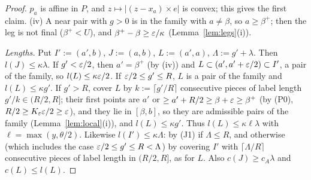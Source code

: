 \begin{proof}
$p_a$ is affine in $P$, and $z\mapsto|(z-x_a)\times e|$ is convex; this gives the first claim. (iv) A near pair with $g>0$ is in the
family with $a\ne\beta$, so $a\ge\beta^+$; then the leg is not final ($\beta^+<U$), and $\beta^+-\beta\ge\varepsilon/\kappa$
(Lemma~\ref{lem:legs}(i)).

\emph{Lengths.} Put $I':=(a',b)$, $J:=(a,b)$, $L:=(a',a)$, $\Lambda:=g'+\lambda$. Then $l(J)\le\kappa\lambda$. If $g'<\varepsilon/2$, then
$a'=\beta^+$ (by (iv)) and $L\subset(a',a'+\varepsilon/2)\subset I'$, a pair of the family, so $l(L)\le\kappa\varepsilon/2$. If $\varepsilon/2\le g'\le R$, $L$ is
a pair of the family and $l(L)\le\kappa g'$. If $g'>R$, cover $L$ by $k:=\lceil g'/R\rceil$ consecutive pieces of label length
$g'/k\in(R/2,R]$; their first points are $a'$ or $\ge a'+R/2\ge\beta+\varepsilon\ge\beta^+$ (by (P0), $R/2\ge K_\varepsilon\varepsilon/2\ge\varepsilon$), and they lie
in $[\beta,b]$, so they are admissible pairs of the family (Lemma~\ref{lem:local}(i)), and $l(L)\le\kappa g'$. Thus
$l(L)\le\kappa\ell\lambda$ with $\ell=\max(y,\theta/2)$. Likewise $l(I')\le\kappa\Lambda$: by (J1) if $\Lambda\le R$, and otherwise (which
includes the case $\varepsilon/2\le g'\le R<\Lambda$) by covering $I'$ with $\lceil\Lambda/R\rceil$ consecutive pieces of label length in
$(R/2,R]$, as for $L$. Also $c(J)\ge c_A\lambda$ and $c(L)\le l(L)$.


\end{proof}

